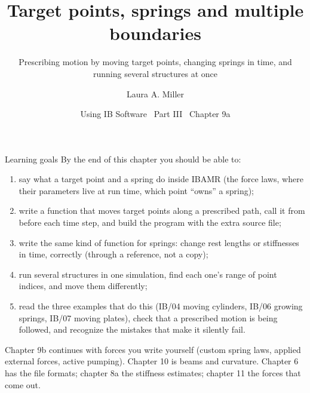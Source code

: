 \documentclass[aspectratio=169,11pt]{beamer}
\title[Target points and springs]{Target points, springs and multiple boundaries}
\subtitle{Prescribing motion by moving target points, changing springs in time, and running several structures at once}
\author[Miller]{Laura A. Miller}
\institute[UArizona]{Department of Mathematics, University of Arizona}
\date{Using IB Software \textbullet\ Part III \textbullet\ Chapter 9a}
\begin{document}
\begin{frame}[plain]
\end{frame}

\begin{frame}{Learning goals}
\label{fr:goals}
\small By the end of this chapter you should be able to:
\begin{enumerate}
  \item say what a target point and a spring do inside IBAMR (the force laws, where their parameters live at run time, which point ``owns'' a spring);
  \item write a function that moves target points along a prescribed path, call it from  before each time step, and build the program with the extra source file;
  \item write the same kind of function for springs: change rest lengths or stiffnesses in time, correctly (through a reference, not a copy);
  \item run several structures in one simulation, find each one's range of point indices, and move them differently;
  \item read the three examples that do this (IB/04 moving cylinders, IB/06 growing springs, IB/07 moving plates), check that a prescribed motion is being followed, and recognize the mistakes that make it silently fail.
\end{enumerate}
\begin{punchbox}
\footnotesize Chapter 9b continues with forces you write yourself (custom spring laws, applied external forces, active pumping). Chapter 10 is beams and curvature. Chapter 6 has the file formats; chapter 8a the stiffness estimates; chapter 11 the forces that come out.
\end{punchbox}
\end{frame}
\end{document}

